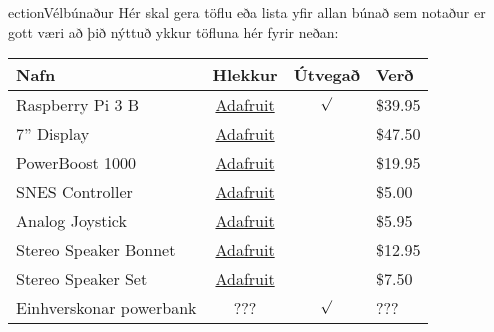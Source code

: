ection{Vélbúnaður}
Hér skal gera töflu eða lista yfir allan búnað sem notaður er gott væri að þið nýttuð ykkur töfluna hér fyrir neðan:


\begin{tabular}{l c c l}
    \textbf{Nafn} & \textbf{Hlekkur} & \textbf{Útvegað} & \textbf{Verð} \\
    \hline
    Raspberry Pi 3 B & \href{https://www.adafruit.com/products/3055}{Adafruit} & $\surd $& \$39.95\\
    \hline
    7'' Display & \href{https://www.adafruit.com/products/2354}{Adafruit} & & \$47.50\\
    \hline
    PowerBoost 1000 & \href{https://www.adafruit.com/products/2465}{Adafruit} & & \$19.95 \\
    \hline
    SNES Controller & \href{https://www.adafruit.com/products/131}{Adafruit} & & \$5.00 \\
    \hline
    Analog Joystick & \href{https://www.adafruit.com/products/512}{Adafruit} & & \$5.95 \\
    \hline
    Stereo Speaker Bonnet & \href{https://www.adafruit.com/products/3346}{Adafruit} & & \$12.95 \\
    \hline
    Stereo Speaker Set & \href{https://www.adafruit.com/products/1669}{Adafruit} & & \$7.50\\
    \hline
    Einhverskonar powerbank & ??? & $\surd $ & ??? \\
\end{tabular}
